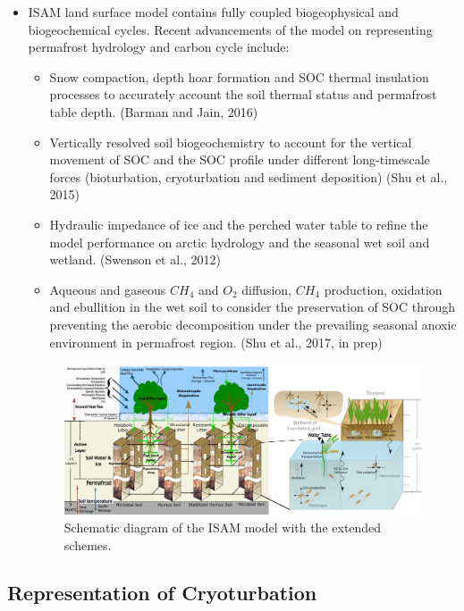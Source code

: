 \documentclass[portait,custom]{sciposter}
\begin{document}
\begin{multicols*}{4}
\begin{itemize}
 \item ISAM land surface model contains fully coupled biogeophysical and biogeochemical cycles. Recent advancements of the model on representing permafrost hydrology and carbon cycle include:
 \begin{itemize}
   \item Snow compaction, depth hoar formation and SOC thermal insulation processes to accurately account the soil thermal status and permafrost table depth. (Barman and Jain, 2016)
   \item Vertically resolved soil biogeochemistry to account for the vertical movement of SOC and the SOC profile under different long-timescale forces (bioturbation, cryoturbation and sediment deposition) (Shu et al., 2015)
   \item Hydraulic impedance of ice and the perched water table to refine the model performance on arctic hydrology and the seasonal wet soil and wetland. (Swenson et al., 2012)
   \item Aqueous and gaseous $CH_4$ and $O_2$ diffusion, $CH_4$ production, oxidation and ebullition in the wet soil to consider the preservation of SOC through preventing the aerobic decomposition under the prevailing seasonal anoxic environment in permafrost region. (Shu et al., 2017, in prep)
 \end{itemize}

\begin{figure}
 \centering
  \includegraphics[width=0.9\columnwidth]{figures/ISAM_schematic_20161208.png}
 \caption{Schematic diagram of the ISAM model with the extended schemes.}
\end{figure}

\end{itemize}

\subsection*{Representation of Cryoturbation}

\begin{itemize}


\end{itemize}
\end{multicols*}
\end{document}
